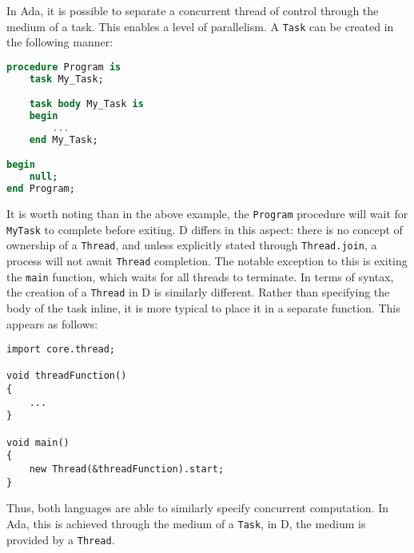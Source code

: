 In Ada, it is possible to separate a concurrent thread of control through the
medium of a task. This enables a level of parallelism. A \texttt{Task} can be 
created in the following manner: 
\begin{lstlisting}[basicstyle=\small,language=Ada]
procedure Program is 
    task My_Task; 

    task body My_Task is 
    begin
        ...
    end My_Task;

begin
    null; 
end Program;
\end{lstlisting}
It is worth noting than in the above example, the \texttt{Program} procedure will wait
for \texttt{My\textunderscore{}Task} to complete before exiting. D differs in this aspect: 
there is no concept of ownership of a \texttt{Thread}, and unless
explicitly stated through \texttt{Thread.join}, a process will not await
\texttt{Thread} completion. The notable exception to this is exiting the
\texttt{main} function, which waits for all threads to terminate. 
In terms of syntax, the creation of a
\texttt{Thread} in D is similarly different. Rather than specifying the body of
the task inline, it is more typical to place it in a separate function. This
appears as follows: 
\begin{lstlisting}[basicstyle=\small]
import core.thread; 

void threadFunction()
{
    ...
}

void main()
{
    new Thread(&threadFunction).start;
}
\end{lstlisting}
Thus, both languages are able to similarly specify concurrent computation. In
Ada, this is achieved through the medium of a \texttt{Task}, in D, the medium
is provided by a \texttt{Thread}. 

